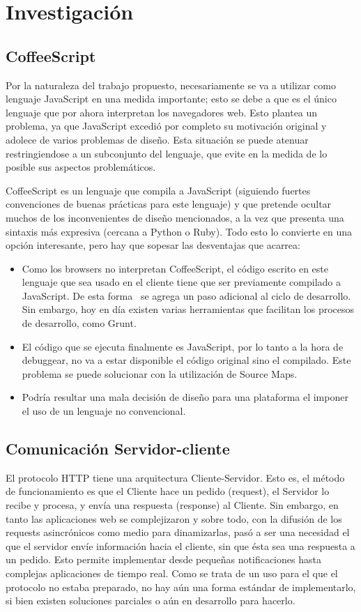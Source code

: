 \documentclass[doc,helv,longtable]{article}
\begin{document}
\section{Investigación}
\subsection{CoffeeScript}


Por la naturaleza del trabajo propuesto, necesariamente se va a utilizar como lenguaje JavaScript en una medida importante; esto se debe a que es el único lenguaje que por ahora interpretan los navegadores web. Esto plantea un problema, ya que JavaScript excedió por completo su motivación original y adolece de varios problemas de diseño\cite{goodparts}. Esta situación se puede atenuar restringiendose a un subconjunto del lenguaje, que evite en la medida de lo posible sus aspectos problemáticos.

CoffeeScript es un lenguaje que compila a JavaScript (siguiendo fuertes convenciones de buenas prácticas para este lenguaje) y que pretende ocultar muchos de los inconvenientes de diseño mencionados, a la vez que presenta una sintaxis más expresiva (cercana a Python o Ruby). Todo esto lo convierte en una opción interesante, pero hay que sopesar las desventajas que acarrea: 
\begin{itemize}
\item  Como los browsers no interpretan CoffeeScript, el código escrito en este lenguaje que sea usado en el cliente tiene que ser previamente compilado a JavaScript. De esta forma  se agrega un paso adicional al ciclo de desarrollo. Sin embargo, hoy en día existen varias herramientas que facilitan los procesos de desarrollo, como Grunt\cite{grunt}.
\item  El código que se ejecuta finalmente es JavaScript, por lo tanto a la hora de debuggear, no va a estar disponible el código original sino el compilado. Este problema se puede solucionar con la utilización de Source Maps\cite{sourcemaps}.
\item  Podría resultar una mala decisión de diseño para una plataforma el imponer el uso de un lenguaje no convencional. 

\end{itemize}

\subsection{Comunicación Servidor-cliente}
El protocolo HTTP tiene una arquitectura Cliente-Servidor. Esto es, el método de funcionamiento es que el Cliente hace un pedido (request), el Servidor lo recibe y procesa, y envía una respuesta (response) al Cliente. Sin embargo, en tanto las aplicaciones web se complejizaron y sobre todo, con la difusión de los requests asincrónicos como medio para dinamizarlas, pasó a ser una necesidad el que el servidor envíe información hacia el cliente, sin que ésta sea una respuesta a un pedido. Esto permite implementar desde pequeñas notificaciones hasta complejas aplicaciones de tiempo real. Como se trata de un uso para el que el protocolo no estaba preparado, no hay aún una forma estándar de implementarlo, si bien existen soluciones parciales o aún en desarrollo para hacerlo\cite{wsvssse}.
\end{document}
